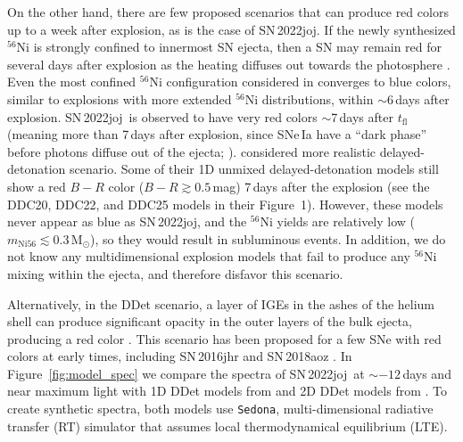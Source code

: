 \documentclass[twocolumn]{aastex631}
\newcommand{\sn}{SN\,2022joj}
\begin{document}
\begin{CJK*}{UTF8}{gbsn}
On the other hand, there are few proposed scenarios that can produce red colors up to a week after explosion, as is the case of \sn. If the newly synthesized $^{56}$Ni is strongly confined to innermost SN ejecta, then a SN may remain red for several days after explosion as the heating diffuses out towards the photosphere \citep{Piro_2016}. Even the most confined $^{56}$Ni configuration considered in \citet{Piro_2016} converges to blue colors, similar to explosions with more extended $^{56}$Ni distributions, within $\sim$6\,days after explosion. \sn\ is observed to have very red colors $\sim$7\,days after $t_\mathrm{fl}$ (meaning more than 7\,days after explosion, since SNe\,Ia have a ``dark phase'' before photons diffuse out of the ejecta; \citealt{Piro_2013}). \citet{Dessart_2014} considered more realistic delayed-detonation scenario. Some of their 1D unmixed delayed-detonation models still show a red $B-R$ color ($B-R\gtrsim0.5$\,mag) 7\,days after the explosion (see the DDC20, DDC22, and DDC25 models in their Figure~1). However, these models never appear as blue as \sn, and the $^{56}$Ni yields are relatively low ($m_\mathrm{Ni56}\lesssim0.3\,\mathrm{M_\odot}$), so they would result in subluminous events. In addition, we do not know any multidimensional explosion models that fail to produce any $^{56}$Ni mixing within the ejecta, and therefore disfavor this scenario.

Alternatively, in the DDet scenario, a layer of IGEs in the ashes of the helium shell can produce significant opacity in the outer layers of the bulk ejecta, producing a red color \citep{polin_observational_2019}. This scenario has been proposed for a few SNe with red colors at early times, including SN\,2016jhr \citep{jiang_16jhr_2017} and SN\,2018aoz \citep{Ni_2022}. In Figure~\ref{fig:model_spec} we compare the spectra of \sn\ at $\sim$$-12$\,days and near maximum light with 1D DDet models from \citet{polin_observational_2019} and 2D DDet models from \citet{Shen_2D_2021}. To create synthetic spectra, both models use \texttt{Sedona}, multi-dimensional radiative transfer (RT) simulator that assumes local thermodynamical equilibrium (LTE).


\end{CJK*}
\end{document}
